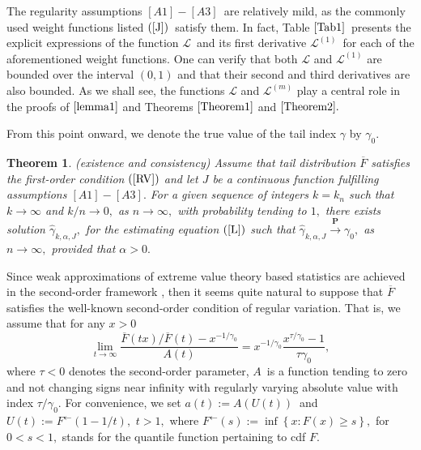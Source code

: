 \documentclass[12pt,reqno,openbib,runningheads,a4paper,portrait]{amsart}%
\newtheorem{theorem}{Theorem}[section]
\begin{document}
\noindent The regularity assumptions $\left[  A1\right]  -\left[  A3\right]
$\ are relatively mild, as the commonly used weight functions listed $\left(
\ref{J}\right)  $\ satisfy them. In fact, Table $\ref{Tab1}$\ presents the
explicit expressions of the function $\mathcal{L}$\ and its first derivative
$\mathcal{L}^{\left(  1\right)  }$\ for each of the aforementioned weight
functions. One can verify that both $\mathcal{L}$ and $\mathcal{L}^{\left(
1\right)  }$ are bounded over the interval $\left(  0,1\right)  $ and that
their second and third derivatives are also bounded. As we shall see, the
functions $\mathcal{L}$ and $\mathcal{L}^{\left(  m\right)  }$ play a central
role in the proofs of $\ref{lemma1}$ and Theorems $\ref{Theorem1}$ and
$\ref{Theorem2}.$\smallskip

\noindent From this point onward, we denote the true value of the tail index
$\gamma$ by $\gamma_{0}.$

\begin{theorem}
\textbf{\label{Theorem1}}(existence and consistency) Assume that tail
distribution $\overline{F}$ satisfies the first-order condition $\left(
\ref{RV}\right)  $ and let $J$ be a continuous function fulfilling assumptions
$\left[  A1\right]  -\left[  A3\right]  .$ For a given sequence of integers
$k=k_{n}$ such that $k\rightarrow\infty$ and $k/n\rightarrow0,$ as
$n\rightarrow\infty,$ with probability tending to $1,$ there exists solution
$\widehat{\gamma}_{k,\alpha,J},$ for the estimating equation $\left(
\ref{L}\right)  $ such that $\widehat{\gamma}_{k,\alpha,J}\overset{\mathbf{P}%
}{\rightarrow}\gamma_{0},$ as $n\rightarrow\infty,$ provided that $\alpha>0.$
\end{theorem}

\noindent Since weak approximations of extreme value theory based statistics
are achieved in the second-order framework \citep[see e.g.][]{deHS96}, then it
seems quite natural to suppose that $\overline{F}$ satisfies the well-known
second-order condition of regular variation. That is, we assume that for any
$x>0$%
\begin{equation}
\lim_{t\rightarrow\infty}\frac{\overline{F}\left(  tx\right)  /\overline
{F}\left(  t\right)  -x^{-1/\gamma_{0}}}{A\left(  t\right)  }=x^{-1/\gamma
_{0}}\dfrac{x^{\tau/\gamma_{0}}-1}{\tau\gamma_{0}}, \label{second-order}%
\end{equation}
where $\tau<0$ denotes the second-order parameter, $A$\ is a function tending
to zero and not changing signs near infinity with regularly varying absolute
value with index $\tau/\gamma_{0}.$ For convenience, we set $a\left(
t\right)  :=A\left(  U\left(  t\right)  \right)  $\textbf{\ }and $U\left(
t\right)  :=F^{\leftarrow}\left(  1-1/t\right)  ,$ $t>1,$ where $F^{\leftarrow
}\left(  s\right)  :=\inf\left\{  x:F\left(  x\right)  \geq s\right\}  ,$ for
$0<s<1,$ stands for the quantile function pertaining to cdf $F.$
\end{document}
